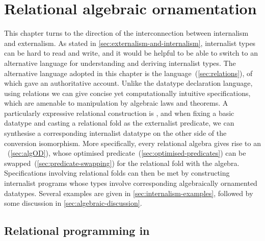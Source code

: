 \chapter{Relational algebraic ornamentation}
\label{chap:algebraic}

This chapter turns to the  direction of the interconnection between internalism and externalism.
As stated in \autoref{sec:externalism-and-internalism}, internalist types can be hard to read and write, and it would be helpful to be able to switch to an alternative language for understanding and deriving internalist types.
The alternative language adopted in this chapter is the  language~(\autoref{sec:relations}), of which \citet{Bird-AoP} gave an authoritative account.
Unlike the datatype declaration language, using relations we can give concise yet computationally intuitive specifications, which are amenable to manipulation by algebraic laws and theorems.
A particularly expressive relational construction is , and when fixing a basic datatype and casting a relational fold as the externalist predicate, we can synthesise a corresponding internalist datatype on the other side of the conversion isomorphism.
More specifically, every relational algebra gives rise to an ~(\autoref{sec:algOD}), whose optimised predicate~(\autoref{sec:optimised-predicates}) can be swapped~(\autoref{sec:predicate-swapping}) for the relational fold with the algebra.
Specifications involving relational folds can then be met by constructing internalist programs whose types involve corresponding algebraically ornamented datatypes.
Several examples are given in \autoref{sec:internalism-examples}, followed by some discussion in \autoref{sec:algebraic-discussion}.

\section{Relational programming in \Agda}
\label{sec:relations}

